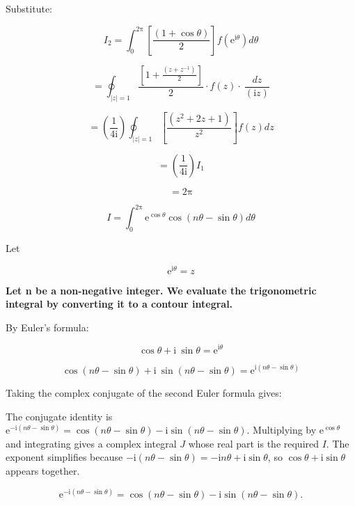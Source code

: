 \documentclass[11pt,a4paper]{article}
\theoremstyle{definition}
\theoremstyle{plain}
\begin{document}
Substitute:

\begin{equation}
I_{2} = \int_{0}^{2\mathrm{\pi}}[\frac{(1 + \cos \theta)}{2}]f(\mathrm{e}^{\mathrm{i}\theta})d\theta
\end{equation}

\[
= \oint_{\vert{}z\vert{} = 1}\frac{[1 + \frac{(z + z^{-1})}{2}]}{2} \cdot f(z) \cdot \ \frac{dz}{(\mathrm{i}z)}
\]

\[
= \left(\frac{1}{4\mathrm{i}}\right)\oint_{\vert{}z\vert{} = 1}[\frac{(z^{2} + 2z + 1)}{z^{2}}]f(z)dz
\]

\[
= \left(\frac{1}{4\mathrm{i}}\right)I_{1}
\]

\[
= 2\mathrm{\pi}
\]

\[
I = \int_{0}^{2\mathrm{\pi}}\mathrm{e}^{\cos \theta}\cos(n\theta - \sin \theta)d\theta
\]

Let

\begin{equation}
\mathrm{e}^{\mathrm{i}\theta} = z
\end{equation}

\textbf{Let n be a non-negative integer. We evaluate the trigonometric integral by converting it to a contour integral.}

By Euler's formula:

\begin{equation}
\cos \theta + \mathrm{i}\ \sin \theta = \mathrm{e}^{\mathrm{i}\theta}
\end{equation}

\[
\cos(n\theta - \sin \theta) + \mathrm{i}\ \sin(n\theta - \sin \theta) = \mathrm{e}^{\mathrm{i}(n\theta - \sin \theta)}
\]

Taking the complex conjugate of the second Euler formula gives:

The conjugate identity is $\mathrm{e}^{-\mathrm{i}(n\theta - \sin \theta)} = \cos(n\theta - \sin \theta) - \mathrm{i}\sin(n\theta - \sin \theta)$. Multiplying by $\mathrm{e}^{\cos \theta}$ and integrating gives a complex integral $J$ whose real part is the required $I$. The exponent simplifies because $-\mathrm{i}(n\theta - \sin \theta) = -\mathrm{i}n\theta + \mathrm{i}\sin \theta$, so $\cos \theta + \mathrm{i}\sin \theta$ appears together.

\begin{equation}
\mathrm{e}^{-\mathrm{i}(n\theta - \sin \theta)} = \cos(n\theta - \sin \theta) - \mathrm{i}\sin(n\theta - \sin \theta).
\end{equation}
\end{document}
